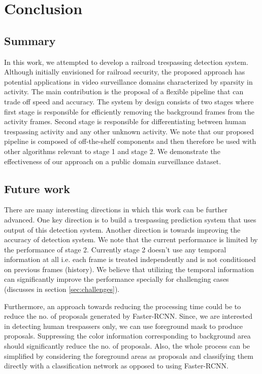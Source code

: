 \section{Conclusion}

\subsection{Summary}
In this work, we attempted to develop a railroad trespassing detection system. Although initially envisioned for railroad security, the proposed approach has potential applications in video surveillance domains characterized by sparsity in activity. The main contribution is the proposal of a flexible pipeline that can trade off speed and accuracy. The system by design consists of two stages where first stage is responsible for efficiently removing the background frames from the activity frames. Second stage is responsible for differentiating between human trespassing activity and any other unknown activity. We note that our proposed pipeline is composed of off-the-shelf components and then therefore be used with other algorithms relevant to stage 1 and stage 2. We demonstrate the effectiveness of our approach on a public domain surveillance dataset. 

\subsection{Future work}
There are many interesting directions in which this work can be further advanced. One key direction is to build a trespassing prediction system that uses output of this detection system. Another direction is towards improving the accuracy of detection system. We note that the current performance is limited by the performance of stage 2. Currently stage 2 doesn't use any temporal information at all i.e. each frame is treated independently and is not conditioned on previous frames (history). We believe that utilizing the temporal information can significantly improve the performance specially for challenging cases (discusses in section \ref{sec:challenges}). 

Furthermore, an approach towards reducing the processing time could be to reduce the no. of proposals generated by Faster-RCNN. Since, we are interested in detecting human trespassers only, we can use foreground mask to produce proposals. Suppressing the color information corresponding to background area should significantly reduce the no. of proposals. Also, the whole process can be simplified by considering the foreground areas as proposals and classifying them directly with a classification network as opposed to using Faster-RCNN. 

\newpage